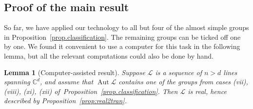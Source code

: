 \documentclass[11pt]{article}
\newtheorem{lemma}[theo]{Lemma}
\theoremstyle{definition}
\numberwithin{equation}{section}
\begin{document}
\subsection{Proof of the main result}

So far, we have applied our technology to all but four of the almost simple groups in Proposition~\ref{prop.classification}.
The remaining groups can be ticked off one by one.
We found it convenient to use a computer for this task in the following lemma, but all the relevant computations could also be done by hand.


\begin{lemma}[Computer-assisted result]
\label{lem: misc cases}
Suppose $\mathscr{L}$ is a sequence of $n > d$ lines spanning $\mathbb{C}^d$, and assume that $\operatorname{Aut} \mathscr{L}$ contains one of the groups from cases (vii), (viii), (xi), (xii) of~Proposition~\ref{prop.classification}.
Then $\mathscr{L}$ is real, hence described by Proposition~\ref{prop:real2tran}.
\end{lemma}
\end{document}
